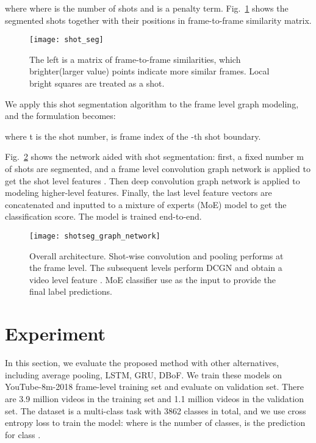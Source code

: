 \documentclass[runningheads]{llncs}
\begin{document}
where
 where  is the number of shots and  is a penalty term. Fig.~\ref{fig:shot_seg}  shows the segmented shots together with their positions in frame-to-frame similarity matrix.

\begin{figure}
\centering
\texttt{[image: shot\_seg]}
\caption{The left is a matrix of frame-to-frame similarities, which brighter(larger value) points indicate more similar frames.  Local bright squares are treated as a shot.}
\label{fig:shot_seg}
\end{figure}

We apply this shot segmentation algorithm to the frame level graph modeling, and the formulation becomes:



 where {t} is the shot number,  is frame index  of the -th shot boundary. 

Fig.~\ref{fig:shotseg_graph_network} shows the network aided with shot segmentation: first, a fixed number {m} of shots are segmented, and a frame level convolution graph network is applied to get the shot level features . Then deep convolution graph network is applied to modeling higher-level features. Finally, the last level feature vectors are concatenated and inputted to a mixture of experts (MoE) \cite{jordan1994hierarchical} model to get the classification score. The model is trained end-to-end.

\begin{figure}
\centering
\texttt{[image: shotseg\_graph\_network]}
\caption{Overall architecture. Shot-wise convolution and pooling performs at the frame level.  The subsequent levels perform DCGN and obtain a video level feature .  MoE classifier use   as the input to provide the final label predictions.}
\label{fig:shotseg_graph_network}
\end{figure}

\section{Experiment}

In this section, we evaluate the proposed method with other alternatives, including average pooling, LSTM, GRU, DBoF. We train these models on YouTube-8m-2018 frame-level training set and evaluate on validation set. There are 3.9 million videos in the training set and 1.1 million videos in the validation set. The dataset is a multi-class task with 3862 classes in total, and we use cross entropy loss to train the model:
  where  is the number of classes,  is the prediction for class .
\end{document}
